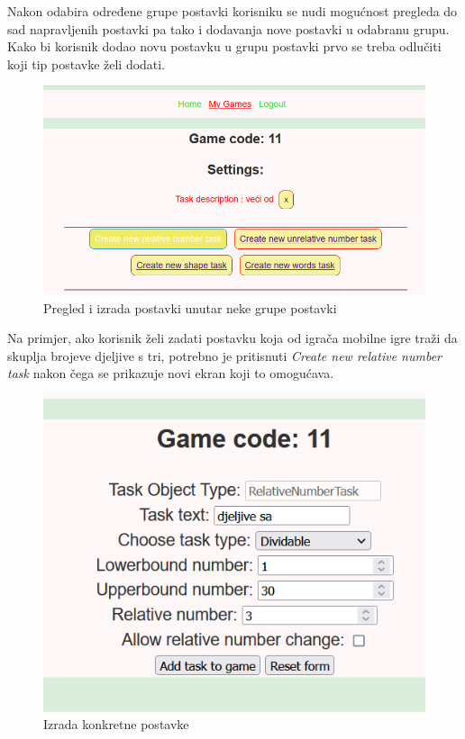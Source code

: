 \documentclass[times, utf8, zavrsni, numeric]{fer}
\begin{document}
	 Nakon odabira određene grupe postavki korisniku se nudi mogućnost pregleda do sad napravljenih postavki pa tako i dodavanja nove postavki u odabranu grupu. Kako bi korisnik dodao novu postavku u grupu postavki prvo se treba odlučiti koji 
	 tip postavke želi dodati. 
	 	\begin{figure}[H]
			\includegraphics[scale = 0.7]{"slike/zadavanjepostavki.png"} 
			\centering
			\caption{Pregled i izrada postavki unutar neke grupe postavki}
			\label{fig:pregledpostavki}
		\end{figure}
	Na primjer, ako korisnik želi zadati postavku koja od igrača mobilne igre traži da skuplja brojeve djeljive s tri, potrebno je pritisnuti \textit{Create new relative number task} nakon čega se prikazuje novi ekran koji to omogućava.
	\begin{figure}[H]
		\includegraphics[scale = 0.9]{"slike/zadavanjekonkretnepostavke.png"} 
		\centering
		\caption{Izrada konkretne postavke}
		\label{fig:izradapostavkedjeljenje}
	\end{figure}
		
\end{document}
